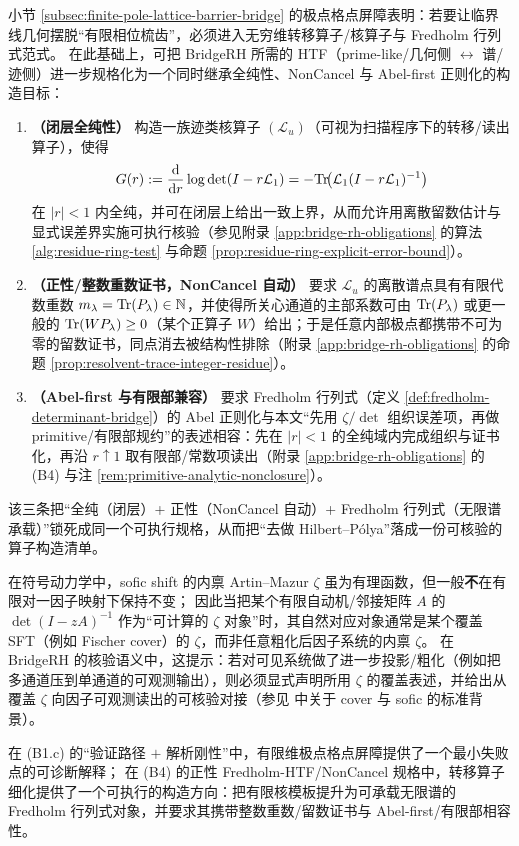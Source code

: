 \begin{remark}\label{rem:positive-fredholm-htf-bridge}
小节 \ref{subsec:finite-pole-lattice-barrier-bridge} 的极点格点屏障表明：若要让临界线几何摆脱“有限相位梳齿”，必须进入无穷维转移算子/核算子与 Fredholm 行列式范式。
在此基础上，可把 BridgeRH 所需的 HTF（prime-like/几何侧 \(\leftrightarrow\) 谱/迹侧）进一步规格化为一个同时继承全纯性、NonCancel 与 Abel-first 正则化的构造目标：
\begin{enumerate}
  \item \textbf{（闭层全纯性）} 构造一族迹类核算子 \((\mathcal{L}_u)\)（可视为扫描程序下的转移/读出算子），使得
  $$
  G(r):=\frac{\mathrm{d}}{\mathrm{d} r}\log\det(I-r\mathcal{L}_1)=-\mathrm{Tr}\!\bigl(\mathcal{L}_1(I-r\mathcal{L}_1)^{-1}\bigr)
  $$
  在 \(|r|<1\) 内全纯，并可在闭层上给出一致上界，从而允许用离散留数估计与显式误差界实施可执行核验（参见附录 \ref{app:bridge-rh-obligations} 的算法 \ref{alg:residue-ring-test} 与命题 \ref{prop:residue-ring-explicit-error-bound}）。
  \item \textbf{（正性/整数重数证书，NonCancel 自动）} 要求 \(\mathcal{L}_u\) 的离散谱点具有有限代数重数 \(m_\lambda=\mathrm{Tr}(P_\lambda)\in\mathbb{N}\)，并使得所关心通道的主部系数可由 \(\mathrm{Tr}(P_\lambda)\) 或更一般的 \(\mathrm{Tr}(WP_\lambda)\ge 0\)（某个正算子 \(W\)）给出；于是任意内部极点都携带不可为零的留数证书，同点消去被结构性排除（附录 \ref{app:bridge-rh-obligations} 的命题 \ref{prop:resolvent-trace-integer-residue}）。
  \item \textbf{（Abel-first 与有限部兼容）} 要求 Fredholm 行列式（定义 \ref{def:fredholm-determinant-bridge}）的 Abel 正则化与本文“先用 \(\zeta/\det\) 组织误差项，再做 primitive/有限部规约”的表述相容：先在 \(|r|<1\) 的全纯域内完成组织与证书化，再沿 \(r\uparrow 1\) 取有限部/常数项读出（附录 \ref{app:bridge-rh-obligations} 的 (B4) 与注 \ref{rem:primitive-analytic-nonclosure}）。
\end{enumerate}
该三条把“全纯（闭层）+ 正性（NonCancel 自动）+ Fredholm 行列式（无限谱承载）”锁死成同一个可执行规格，从而把“去做 Hilbert--P{\'o}lya”落成一份可核验的算子构造清单。
\end{remark}

\begin{remark}\label{rem:sofic-zeta-noninvariance}
在符号动力学中，sofic shift 的内禀 Artin--Mazur \(\zeta\) 虽为有理函数，但一般\textbf{不}在有限对一因子映射下保持不变；
因此当把某个有限自动机/邻接矩阵 \(A\) 的 \(\det(I-zA)^{-1}\) 作为“可计算的 \(\zeta\) 对象”时，其自然对应对象通常是某个覆盖 SFT（例如 Fischer cover）的 \(\zeta\)，而非任意粗化后因子系统的内禀 \(\zeta\)。
在 BridgeRH 的核验语义中，这提示：若对可见系统做了进一步投影/粗化（例如把多通道压到单通道的可观测输出），则必须显式声明所用 \(\zeta\) 的覆盖表述，并给出从覆盖 \(\zeta\) 向因子可观测读出的可核验对接（参见 \cite{LindMarcus1995} 中关于 cover 与 sofic 的标准背景）。
\end{remark}

\begin{remark}\label{rem:pole-lattice-to-bridge}
在 (B1.c) 的“验证路径 $+$ 解析刚性”中，有限维极点格点屏障提供了一个最小失败点的可诊断解释；
在 (B4) 的正性 Fredholm-HTF/NonCancel 规格中，转移算子细化提供了一个可执行的构造方向：把有限核模板提升为可承载无限谱的 Fredholm 行列式对象，并要求其携带整数重数/留数证书与 Abel-first/有限部相容性。
\end{remark}


